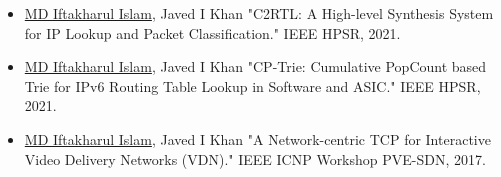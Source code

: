 \documentclass[10pt,a4paper,ragged2e]{altacv}
\begin{document}
\begin{itemize}
	\item \underline{MD Iftakharul Islam}, Javed I Khan "C2RTL: A High-level Synthesis System for IP Lookup and Packet Classification." IEEE HPSR, 2021.
	\item \underline{MD Iftakharul Islam}, Javed I Khan "CP-Trie: Cumulative PopCount based Trie for IPv6 Routing Table Lookup in Software and ASIC." IEEE HPSR, 2021.
	\item \underline{MD Iftakharul Islam}, Javed I Khan "A Network-centric TCP for Interactive Video Delivery Networks (VDN)." IEEE ICNP Workshop PVE-SDN, 2017.
	
\end{itemize}






\end{document}
